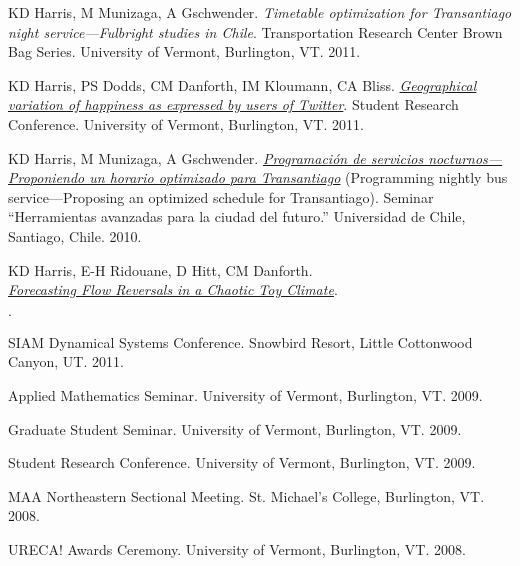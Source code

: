 \documentclass[margin,line]{res}
\newenvironment{list1}{
  \begin{list}{$\cdot$}{%
      \setlength{\itemsep}{0in}
      \setlength{\parsep}{0in} \setlength{\parskip}{0in}
      \setlength{\topsep}{0in} \setlength{\partopsep}{0in} 
      \setlength{\leftmargin}{0.17in}}}{\end{list}}
\begin{document}
\begin{resume}
  KD Harris, M Munizaga, A Gschwender.
  \textit{Timetable optimization for Transantiago night service---Fulbright
    studies in Chile}.
  Transportation Research Center Brown Bag Series.
  University of Vermont, Burlington, VT. 2011.

  KD Harris, PS Dodds, CM Danforth, IM Kloumann, CA Bliss.
  \textit{\href{https://glomerul.us/presentations/2011-04-25_twitter_geo_happiness.pdf}
    {Geographical variation of happiness as expressed by users of Twitter}}.
  Student Research Conference.
  University of Vermont, Burlington, VT. 2011.

  KD Harris, M Munizaga, A Gschwender.
  \textit{\href{https://glomerul.us/presentations/2010-12-15_fulbright.pdf}
    {Programaci\'{o}n de servicios nocturnos---Proponiendo
      un horario optimizado para Transantiago}}
  (Programming nightly bus service---Proposing 
  an optimized schedule for Transantiago).
  Seminar ``Herramientas avanzadas para la ciudad del futuro.''
  Universidad de Chile, Santiago, Chile. 2010.
  
  KD Harris, E-H Ridouane, D Hitt, CM Danforth. \\
  \textit{\href{https://glomerul.us/presentations/2011-05-21_siam_thermosyphon.pdf}
    {Forecasting Flow Reversals in a Chaotic Toy Climate}}. 
  \begin{list1}
  \item SIAM Dynamical Systems Conference. Snowbird Resort,
    Little Cottonwood Canyon, UT. 2011.
  \item Applied Mathematics Seminar. University of Vermont, 
    Burlington, VT. 2009.
  \item Graduate Student Seminar. 
    University of Vermont, Burlington, VT. 2009.
  \item Student Research Conference.
    University of Vermont, Burlington, VT. 2009.
  \item MAA Northeastern Sectional Meeting. St. Michael's College, 
    Burlington, VT. 2008.
  \item URECA! Awards Ceremony. 
    University of Vermont, Burlington, VT. 2008.
  \end{list1}




\end{resume}
\end{document}
